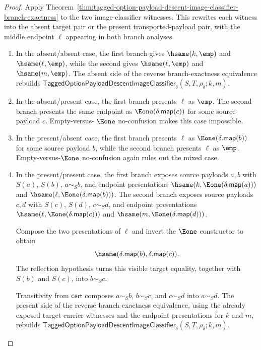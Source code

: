 \begin{proof}
Apply
Theorem~\ref{thm:tagged-option-payload-descent-image-classifier-branch-exactness}
to the two image-classifier witnesses. This rewrites each witness into the
absent target pair or the present transported-payload pair, with the middle
endpoint $\ell$ appearing in both branch analyses.

\begin{enumerate}
  \item In the absent/absent case, the first branch gives $\hsame(k,\emp)$ and
  $\hsame(\ell,\emp)$, while the second gives $\hsame(\ell,\emp)$ and
  $\hsame(m,\emp)$. The absent side of the reverse branch-exactness equivalence
  rebuilds
  $\mathsf{TaggedOptionPayloadDescentImageClassifier}_{\delta}
  (S,T,\rho_{\delta};k,m)$.

  \item In the absent/present case, the first branch presents $\ell$ as $\emp$.
  The second branch presents the same endpoint as
  $\Eone(\delta.\mathsf{map}(c))$ for some source payload $c$. Empty-versus-
  $\Eone$ no-confusion makes this case impossible.

  \item In the present/absent case, the first branch presents $\ell$ as
  $\Eone(\delta.\mathsf{map}(b))$ for some source payload $b$, while the second
  branch presents $\ell$ as $\emp$. Empty-versus-$\Eone$ no-confusion again
  rules out the mixed case.

  \item In the present/present case, the first branch exposes source payloads
  $a,b$ with $S(a)$, $S(b)$, $a\sim_S b$, and endpoint presentations
  $\hsame(k,\Eone(\delta.\mathsf{map}(a)))$ and
  $\hsame(\ell,\Eone(\delta.\mathsf{map}(b)))$. The second branch exposes
  source payloads $c,d$ with $S(c)$, $S(d)$, $c\sim_S d$, and endpoint
  presentations $\hsame(\ell,\Eone(\delta.\mathsf{map}(c)))$ and
  $\hsame(m,\Eone(\delta.\mathsf{map}(d)))$.

  Compose the two presentations of $\ell$ and invert the $\Eone$ constructor to
  obtain
  $$
  \hsame(\delta.\mathsf{map}(b),\delta.\mathsf{map}(c)).
  $$
  The reflection hypothesis turns this visible target equality, together with
  $S(b)$ and $S(c)$, into $b\sim_S c$.

  Transitivity from $\mathsf{cert}$ composes $a\sim_S b$, $b\sim_S c$, and
  $c\sim_S d$ into $a\sim_S d$. The present side of the reverse
  branch-exactness equivalence, using the already exposed target carrier
  witnesses and the endpoint presentations for $k$ and $m$, rebuilds
  $\mathsf{TaggedOptionPayloadDescentImageClassifier}_{\delta}
  (S,T,\rho_{\delta};k,m)$.
\end{enumerate}
\end{proof}

